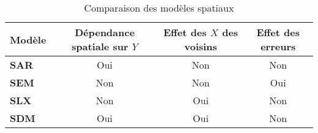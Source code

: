 \documentclass[
]{article}
\begin{document}
\begin{table}[h]
    \centering
    \begin{tabular}{|l|c|c|c|}
        \hline
        \textbf{Modèle} & \textbf{Dépendance spatiale sur \( Y \)} & \textbf{Effet des \( X \) des voisins} & \textbf{Effet des erreurs} \\
        \hline
        \textbf{SAR}  & Oui  & Non  & Non \\
        \hline
        \textbf{SEM}  & Non  & Non  & Oui \\
        \hline
        \textbf{SLX}  & Non  & Oui  & Non \\
        \hline
        \textbf{SDM}  & Oui  & Oui  & Non \\
        \hline
    \end{tabular}
    \caption{Comparaison des modèles spatiaux}
    \label{tab:comparaison_modeles}
\end{table}
\end{document}
